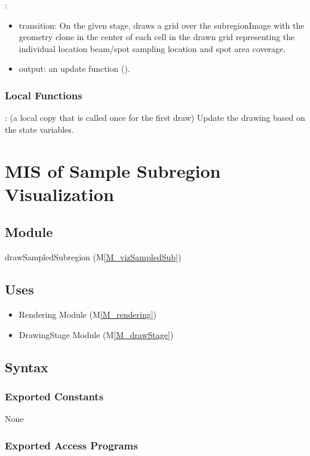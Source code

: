 \documentclass[12pt, titlepage]{article}
\newcommand{\mref}[1]{M\ref{#1}}
\newcommand{\mrefp}[1]{(\mref{#1})}
\newcommand{\mreff}[1]{Module \mrefp{#1}}
\begin{document}
\noindent {}:
\begin{itemize}
\item transition: On the given stage, draws a grid over the subregionImage with
  the  geometry clone in the center of each cell in the drawn grid
  representing the individual location beam/spot sampling location and spot area coverage.
\item output: an update function ().
\end{itemize}

\subsubsection{Local Functions}
: (a local copy that is called once for the first draw)
  Update the drawing based on the state variables.

\newpage



\section{MIS of Sample Subregion Visualization} \label{MS_vizSampledSub}

\subsection{Module}
drawSampledSubregion \mrefp{M_vizSampledSub}

\subsection{Uses}
\begin{itemize}
  \item Rendering \mreff{M_rendering}
  \item DrawingStage \mreff{M_drawStage}
\end{itemize}

\subsection{Syntax}

\subsubsection{Exported Constants}
None
\subsubsection{Exported Access Programs}
\end{document}

